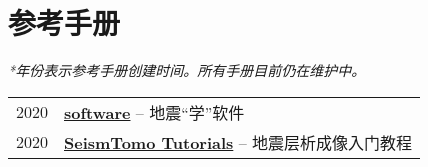 \section*{参考手册}

\textit{*年份表示参考手册创建时间。所有手册目前仍在维护中。}

\begin{tabular}{p{} p{}}
2020 &	\textbf{\href{https://seismo-learn.org/software/}{software}} -- 地震“学”软件 \\
2020 &  \textbf{\href{https://migg-ntu.github.io/SeisTomo_Tutorials/}{SeismTomo Tutorials}} -- 地震层析成像入门教程 \\
\end{tabular}
